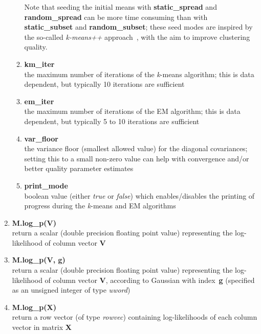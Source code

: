\begin{enumerate}[{$\bullet$}]
\begin{small}
\begin{enumerate}[{-}]
\vspace{-1.5ex}
Note that seeding the initial means with {\bf static\_spread} and {\bf random\_spread}
can be more time consuming than with {\bf static\_subset} and {\bf random\_subset};
these seed modes are inspired by the so-called {\it k-means++} approach~\cite{Arthur_2007}, with the aim to improve clustering quality.
\vspace{1ex}

\item
{\bf km\_iter}\\
the maximum number of iterations of the {\it k}-means algorithm; this is data dependent, but typically 10 iterations are sufficient

\item
{\bf em\_iter}\\
the maximum number of iterations of the EM algorithm; this is data dependent, but typically 5 to 10 iterations are sufficient

\item
{\bf var\_floor}\\
the variance floor (smallest allowed value) for the diagonal covariances; setting this to a small non-zero value can help with convergence and/or better quality parameter estimates

\item
{\bf print\_mode}\\
boolean value (either {\it true} or {\it false}) which enables/disables the printing of progress during the {\it k}-means and EM algorithms 

\end{enumerate}
\end{small}

\item
{\bf M.log\_p(V)}\\
return a scalar (double precision floating point value) representing the log-likelihood of column vector {\bf V}

\item
{\bf M.log\_p(V, g)}\\
return a scalar (double precision floating point value) representing the log-likelihood of column vector {\bf V},
according to Gaussian with index~{\bf g} (specified as an unsigned integer of type {\it uword})

\item
{\bf M.log\_p(X)}\\
return a row vector (of type {\it rowvec}) containing log-likelihoods of each column vector in matrix {\bf X}



\end{enumerate}
